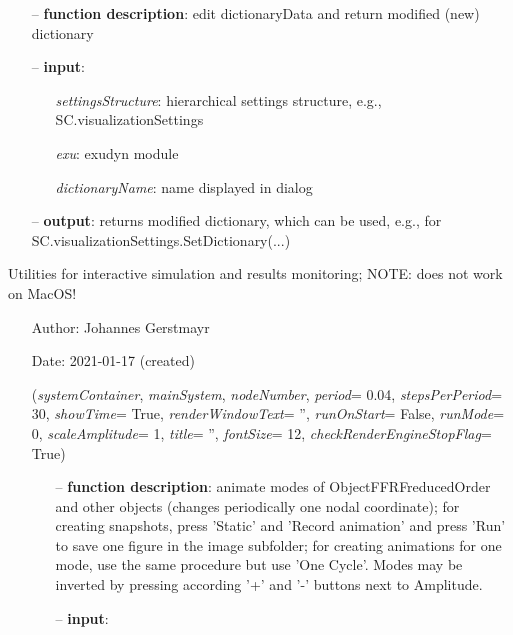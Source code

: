 \begin{itemize}[leftmargin=1.4cm]
\begin{itemize}[leftmargin=1.4cm]
\begin{itemize}[leftmargin=0.5cm]
\begin{itemize}[leftmargin=1.4cm]
\begin{itemize}[leftmargin=1.4cm]
\begin{itemize}[leftmargin=0.5cm]
\begin{itemize}[leftmargin=1.4cm]
\begin{itemize}[leftmargin=0.5cm]
\begin{itemize}[leftmargin=1.4cm]
\begin{itemize}[leftmargin=0.7cm]
  \item[--]  {\bf function description}: edit dictionaryData and return modified (new) dictionary  \item[--]  {\bf input}: \vspace{-6pt}
  \begin{itemize}[leftmargin=1.2cm]
\setlength{\itemindent}{-0.7cm}
    \item[] {\it settingsStructure}: hierarchical settings structure, e.g., SC.visualizationSettings
    \item[] {\it   exu}: exudyn module
    \item[] {\it   dictionaryName}: name displayed in dialog
  \end{itemize}
  \item[--]  {\bf output}: returns modified dictionary, which can be used, e.g., for SC.visualizationSettings.SetDictionary(...)\vspace{12pt}\end{itemize}
%
\label{sec:module:interactive}
  Utilities for interactive simulation and results monitoring; NOTE: does not work on MacOS!
\begin{itemize}[leftmargin=1.4cm]
\setlength{\itemindent}{-1.4cm}
\item[]Author:    Johannes Gerstmayr
\item[]Date:      2021-01-17 (created)
\ei
\begin{flushleft}
\label{sec:interactive:AnimateModes}
({\it systemContainer}, {\it mainSystem}, {\it nodeNumber}, {\it period}= 0.04, {\it stepsPerPeriod}= 30, {\it showTime}= True, {\it renderWindowText}= '', {\it runOnStart}= False, {\it runMode}= 0, {\it scaleAmplitude}= 1, {\it title}= '', {\it fontSize}= 12, {\it checkRenderEngineStopFlag}= True)
\end{flushleft}
\setlength{\itemindent}{0.7cm}
\begin{itemize}[leftmargin=0.7cm]
  \item[--]  {\bf function description}: animate modes of ObjectFFRFreducedOrder and other objects (changes periodically one nodal coordinate); for creating snapshots, press 'Static' and 'Record animation' and press 'Run' to save one figure in the image subfolder; for creating animations for one mode, use the same procedure but use 'One Cycle'. Modes may be inverted by pressing according '+' and '-' buttons next to Amplitude.  \item[--]  {\bf input}: \vspace{-6pt}

\end{itemize}
\end{itemize}
\end{itemize}
\end{itemize}
\end{itemize}
\end{itemize}
\end{itemize}
\end{itemize}
\end{itemize}
\end{itemize}
\end{itemize}
